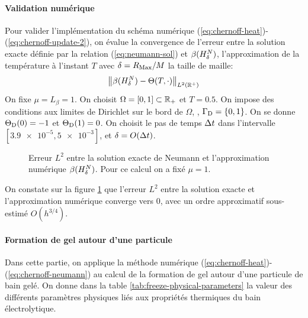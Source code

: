 \paragraph{Validation numérique}
Pour valider l'implémentation du schéma numérique
(\ref{eq:chernoff-heat})-(\ref{eq:chernoff-update-2}), on évalue la
convergence de l'erreur entre la solution exacte définie par la
relation (\ref{eq:neumann-sol}) et $\beta(H^N_\delta)$,
l'approximation de la température à l'instant $T$ avec $\delta =
R_\mathrm{Max}/M$ la taille de maille:
\begin{equation}
\left\lVert \beta(H^N_\delta) - \Theta(T, \cdot) \right\rVert_{L^2(\mathbb R^+)}
\end{equation}
On fixe $\mu = L_\beta =
1$. On choisit $\Omega = [0, 1] \subset {\mathbb R_+}$ et $T = 0.5$. On
impose des conditions aux limites de Dirichlet sur le bord de
$\Omega$, \ie, $\Gamma_\mathrm{D} = \left\{ 0, 1 \right\}$. On se donne
$\Theta_\mathrm{D}(0) = -1$ et $\Theta_\mathrm{D}(1) =
0$. On choisit le pas de temps $\Delta t$ dans l'intervalle
$[\num{3.9e-5}, \num{5e-3}]$, et $\delta = O(\Delta t)$.

\begin{figure}[h]
  \begin{center}
    
    \caption{Erreur $L^2$ entre la solution exacte de Neumann et
      l'approximation numérique
      $\beta(H^N_\delta)$. Pour ce calcul on a fixé
      $\mu = 1$.}
    \label{fig:neumann-convergence}
  \end{center}
\end{figure}

On constate sur la figure \ref{fig:neumann-convergence} que l'erreur
$L^2$ entre la solution exacte et l'approximation numérique converge
vers 0, avec un ordre approximatif sous-estimé  $O(h^{3/4})$.


\paragraph{Formation de gel autour d'une particule}
Dans cette partie, on applique la méthode numérique
(\ref{eq:chernoff-heat})-(\ref{eq:chernoff-neumann}) au calcul de la
formation de gel autour d'une particule de bain gelé.  On donne dans
la table \ref{tab:freeze-physical-parameters} la valeur des
différents paramètres physiques liés aux propriétés thermiques du bain
électrolytique.

